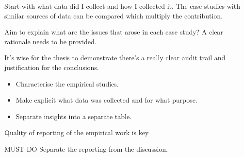 Start with what data did I collect and how I collected it. The case studies with similar sources of data can be compared which multiply the contribution.

Aim to explain what are the issues that arose in each case study?
A clear rationale needs to be provided. 

It's wise for the thesis to demonstrate there's a really clear audit trail and justification for the conclusions.

\begin{itemize}
    \item Characterise the empirical studies.
    \item Make explicit what data was collected and for what purpose. 
    \item Separate insights into a separate table. 
\end{itemize}

Quality of reporting of the empirical work is key


MUST-DO Separate the reporting from the discussion.



